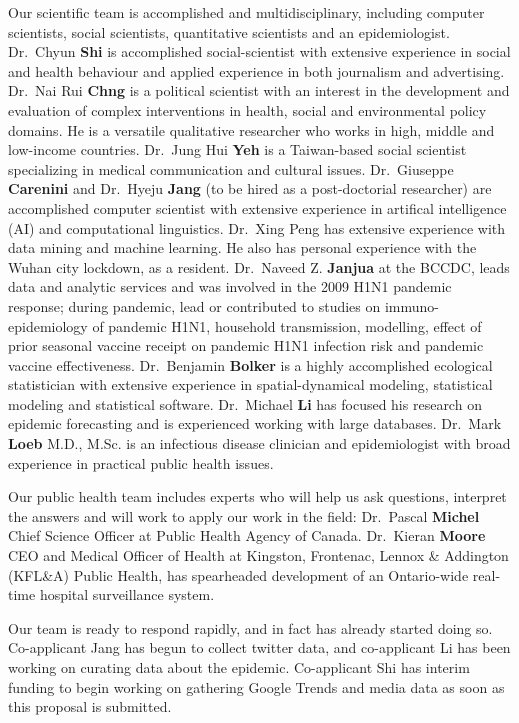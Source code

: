 Our scientific team is accomplished and multidisciplinary, including computer scientists, social scientists, quantitative scientists and an epidemiologist. 
Dr.\ Chyun \textbf{Shi} is accomplished social-scientist with extensive experience in social and health behaviour and applied experience in both journalism and advertising. 
Dr.\ Nai Rui \textbf{Chng} is a political scientist with an interest in the development and evaluation of complex interventions in health, social and environmental policy domains. He is a versatile qualitative researcher who works in high, middle and low-income countries.
Dr.\ Jung Hui \textbf{Yeh} is a Taiwan-based social scientist specializing in medical communication and cultural issues.
Dr.\ Giuseppe \textbf{Carenini} and Dr.\ Hyeju \textbf{Jang} (to be hired as a post-doctorial researcher) are accomplished computer scientist with extensive experience in artifical intelligence (AI) and computational linguistics.
Dr.\ Xing Peng  has extensive experience with data mining and machine learning. He also has personal experience with the Wuhan city lockdown, as a resident.
Dr.\ Naveed Z. \textbf{Janjua} at the BCCDC, leads data and analytic services and was involved in the 2009 H1N1 pandemic response; during pandemic, lead or contributed to studies on  immuno-epidemiology of pandemic H1N1, household transmission, modelling, effect of prior seasonal vaccine receipt on pandemic H1N1 infection risk and pandemic vaccine effectiveness. 
Dr.\ Benjamin \textbf{Bolker} is a highly accomplished ecological statistician with extensive experience in spatial-dynamical modeling, statistical modeling and statistical software.
Dr.\ Michael \textbf{Li} has focused his research on epidemic forecasting and is experienced working with large databases. 
Dr.\ Mark \textbf{Loeb} M.D., M.Sc. is an infectious disease clinician and epidemiologist with broad experience in practical public health issues.

Our public health team includes experts who will help us ask questions, interpret the answers and will work to apply our work in the field:
Dr.\ Pascal \textbf{Michel} Chief Science Officer at Public Health Agency of Canada. 
Dr.\ Kieran \textbf{Moore} CEO and Medical Officer of Health at Kingston, Frontenac, Lennox & Addington (KFL&A) Public Health, has spearheaded development of an Ontario-wide real-time hospital surveillance system.

Our team is ready to respond rapidly, and in fact has already started doing so. Co-applicant Jang has begun to collect twitter data, and co-applicant Li has been working on curating data about the epidemic. Co-applicant Shi has interim funding to begin working on gathering Google Trends and media data as soon as this proposal is submitted.

